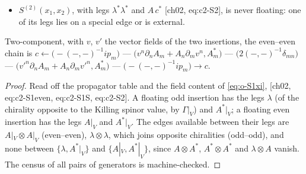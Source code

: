 \begin{lemma}
\begin{itemize}
\item $S^{(2)}(x_1,x_2)$, with legs $\lambda^*\lambda^*$ and $A\,c^*$ [ch02, eq:c2-S2], is never floating: one of its legs lies on a special edge or is external.
\end{itemize}
Two-component, with $v$, $v'$ the vector fields of the two insertions, the even--even chain is $c\leftarrow\big(-(-,-)^{-1}ip_m\big)$ --- $\big(v^n\partial_nA_m+A_n\partial_mv^n,A^*_m\big)$ --- $\big(2(-,-)^{-1}\delta_{mn}\big)$ --- $\big(v'^n\partial_nA_m+A_n\partial_mv'^n,A^*_m\big)$ --- $\big(-(-,-)^{-1}ip_m\big)\rightarrow c$.
\end{lemma}

\begin{proof}
Read off the propagator table and the field content of \eqref{eq:o-S1xi}, [ch02, eq:c2-S1even, eq:c2-S1S, eq:c2-S2]. A floating odd insertion has the legs $\lambda$ (of the chirality opposite to the Killing spinor value, by $\Gamma|_V$) and $A^*|_V$; a floating even insertion has the legs $A|_V$ and $A^*|_V$. The edges available between their legs are $A|_V\otimes A|_V$ (even--even), $\lambda\otimes\lambda$, which joins opposite chiralities (odd--odd), and none between $\{\lambda,A^*|_V\}$ and $\{A|_V,A^*|_V\}$, since $A\otimes A^*$, $A^*\otimes A^*$ and $\lambda\otimes A$ vanish. The census of all pairs of generators is machine-checked.
\end{proof}

